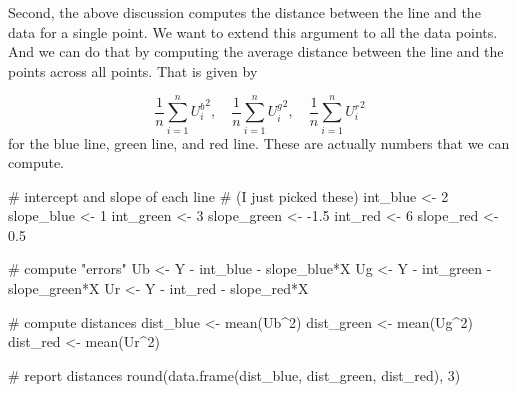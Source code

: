 \documentclass[
  letterpaper,
  DIV=11,
  numbers=noendperiod]{scrreprt}
\newenvironment{Shaded}{\begin{snugshade}}{\end{snugshade}}
\newcommand{\CommentTok}[1]{\textcolor[rgb]{0.37,0.37,0.37}{#1}}
\newcommand{\DecValTok}[1]{\textcolor[rgb]{0.68,0.00,0.00}{#1}}
\newcommand{\FloatTok}[1]{\textcolor[rgb]{0.68,0.00,0.00}{#1}}
\newcommand{\FunctionTok}[1]{\textcolor[rgb]{0.28,0.35,0.67}{#1}}
\newcommand{\NormalTok}[1]{\textcolor[rgb]{0.00,0.23,0.31}{#1}}
\newcommand{\OtherTok}[1]{\textcolor[rgb]{0.00,0.23,0.31}{#1}}
\newcommand{\SpecialCharTok}[1]{\textcolor[rgb]{0.37,0.37,0.37}{#1}}
\begin{document}
Second, the above discussion computes the distance between the line and
the data for a single point. We want to extend this argument to all the
data points. And we can do that by computing the average distance
between the line and the points across all points. That is given by

\[
  \frac{1}{n}\sum_{i=1}^n {U_i^b}^2, \quad \frac{1}{n}\sum_{i=1}^n {U_i^g}^2, \quad \frac{1}{n}\sum_{i=1}^n {U_i^r}^2
\] for the blue line, green line, and red line. These are actually
numbers that we can compute.

\begin{Shaded}
\begin{Highlighting}[]
\CommentTok{\# intercept and slope of each line}
\CommentTok{\# (I just picked these)}
\NormalTok{int\_blue }\OtherTok{\textless{}{-}} \DecValTok{2}
\NormalTok{slope\_blue }\OtherTok{\textless{}{-}} \DecValTok{1}
\NormalTok{int\_green }\OtherTok{\textless{}{-}} \DecValTok{3}
\NormalTok{slope\_green }\OtherTok{\textless{}{-}} \SpecialCharTok{{-}}\FloatTok{1.5}
\NormalTok{int\_red }\OtherTok{\textless{}{-}} \DecValTok{6}
\NormalTok{slope\_red }\OtherTok{\textless{}{-}} \FloatTok{0.5}

\CommentTok{\# compute "errors"}
\NormalTok{Ub }\OtherTok{\textless{}{-}}\NormalTok{ Y }\SpecialCharTok{{-}}\NormalTok{ int\_blue }\SpecialCharTok{{-}}\NormalTok{ slope\_blue}\SpecialCharTok{*}\NormalTok{X}
\NormalTok{Ug }\OtherTok{\textless{}{-}}\NormalTok{ Y }\SpecialCharTok{{-}}\NormalTok{ int\_green }\SpecialCharTok{{-}}\NormalTok{ slope\_green}\SpecialCharTok{*}\NormalTok{X}
\NormalTok{Ur }\OtherTok{\textless{}{-}}\NormalTok{ Y }\SpecialCharTok{{-}}\NormalTok{ int\_red }\SpecialCharTok{{-}}\NormalTok{ slope\_red}\SpecialCharTok{*}\NormalTok{X}

\CommentTok{\# compute distances}
\NormalTok{dist\_blue }\OtherTok{\textless{}{-}} \FunctionTok{mean}\NormalTok{(Ub}\SpecialCharTok{\^{}}\DecValTok{2}\NormalTok{)}
\NormalTok{dist\_green }\OtherTok{\textless{}{-}} \FunctionTok{mean}\NormalTok{(Ug}\SpecialCharTok{\^{}}\DecValTok{2}\NormalTok{)}
\NormalTok{dist\_red }\OtherTok{\textless{}{-}} \FunctionTok{mean}\NormalTok{(Ur}\SpecialCharTok{\^{}}\DecValTok{2}\NormalTok{)}

\CommentTok{\# report distances}
\FunctionTok{round}\NormalTok{(}\FunctionTok{data.frame}\NormalTok{(dist\_blue, dist\_green, dist\_red), }\DecValTok{3}\NormalTok{)}
\end{Highlighting}
\end{Shaded}
\end{document}
